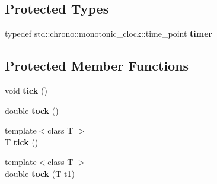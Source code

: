\subsection*{Protected Types}
\begin{DoxyCompactItemize}
\item 
\mbox{\label{classEngine_aabf30721fe5b9d5a0596aceddf4fc8ad}} 
typedef std\+::chrono\+::monotonic\+\_\+clock\+::time\+\_\+point {\bfseries timer}
\end{DoxyCompactItemize}
\subsection*{Protected Member Functions}
\begin{DoxyCompactItemize}
\item 
\mbox{\label{classEngine_a862870af01354ec1327bae82074e836f}} 
void {\bfseries tick} ()
\item 
\mbox{\label{classEngine_a09c7704a2bef626ce6c80e504a178bf9}} 
double {\bfseries tock} ()
\item 
\mbox{\label{classEngine_a8236c8dbd88d7398fa135e9d660217a2}} 
{\footnotesize template$<$class T $>$ }\\T {\bfseries tick} ()
\item 
\mbox{\label{classEngine_a2823156001f3e2bbdbcbdb4d29322272}} 
{\footnotesize template$<$class T $>$ }\\double {\bfseries tock} (T t1)
\end{DoxyCompactItemize}
